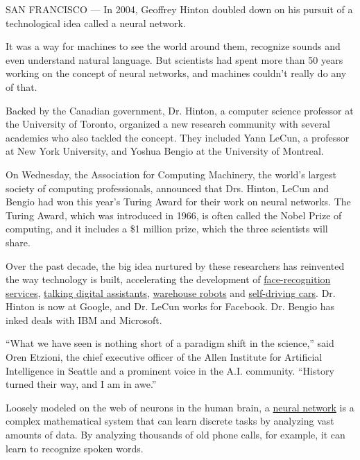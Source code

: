 SAN FRANCISCO --- In 2004, Geoffrey Hinton doubled down on his pursuit
of a technological idea called a neural network.

It was a way for machines to see the world around them, recognize sounds
and even understand natural language. But scientists had spent more than
50 years working on the concept of neural networks, and machines
couldn't really do any of that.

Backed by the Canadian government, Dr. Hinton, a computer science
professor at the University of Toronto, organized a new research
community with several academics who also tackled the concept. They
included Yann LeCun, a professor at New York University, and Yoshua
Bengio at the University of Montreal.

On Wednesday, the Association for Computing Machinery, the world's
largest society of computing professionals, announced that Drs. Hinton,
LeCun and Bengio had won this year's Turing Award for their work on
neural networks. The Turing Award, which was introduced in 1966, is
often called the Nobel Prize of computing, and it includes a \$1 million
prize, which the three scientists will share.

Over the past decade, the big idea nurtured by these researchers has
reinvented the way technology is built, accelerating the development of
\href{https://www.nytimes3xbfgragh.onion/2018/06/29/business/newspaper-shooting-facial-recognition.html}{face-recognition
services},
\href{https://www.nytimes3xbfgragh.onion/interactive/2018/08/17/technology/alexa-siri-conversation.html}{talking
digital assistants},
\href{https://www.nytimes3xbfgragh.onion/2017/09/10/business/warehouse-robots-learning.html}{warehouse
robots} and
\href{https://www.nytimes3xbfgragh.onion/2018/01/04/technology/self-driving-cars-aurora.html}{self-driving
cars}. Dr. Hinton is now at Google, and Dr. LeCun works for Facebook.
Dr. Bengio has inked deals with IBM and Microsoft.

``What we have seen is nothing short of a paradigm shift in the
science,'' said Oren Etzioni, the chief executive officer of the Allen
Institute for Artificial Intelligence in Seattle and a prominent voice
in the A.I. community. ``History turned their way, and I am in awe.''

Loosely modeled on the web of neurons in the human brain, a
\href{https://www.nytimes3xbfgragh.onion/2018/03/06/technology/google-artificial-intelligence.html}{neural
network} is a complex mathematical system that can learn discrete tasks
by analyzing vast amounts of data. By analyzing thousands of old phone
calls, for example, it can learn to recognize spoken words.

